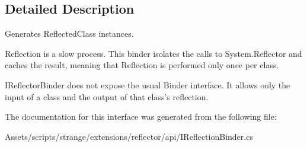 \subsection{Detailed Description}
Generates {\ttfamily Reflected\-Class} instances. 

Reflection is a slow process. This binder isolates the calls to System.\-Reflector and caches the result, meaning that Reflection is performed only once per class.

I\-Reflector\-Binder does not expose the usual Binder interface. It allows only the input of a class and the output of that class's reflection. 

The documentation for this interface was generated from the following file\-:\begin{DoxyCompactItemize}
\item 
Assets/scripts/strange/extensions/reflector/api/I\-Reflection\-Binder.\-cs\end{DoxyCompactItemize}
